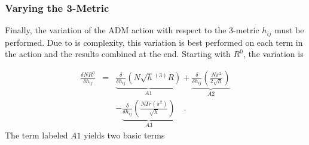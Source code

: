 \documentclass[twocolumn]{article}
\def\.{{\quad .}}
\begin{document}
\subsubsection{Varying the 3-Metric}

Finally, the variation of the ADM action with respect to the 3-metric $h_{ij}$
must be performed.  Due to is complexity, this variation is best performed
on each term in the action and the results combined at the end.  Starting with
$R^0$, the variation is

\begin{eqnarray*}
   \frac{\delta N R^0}{\delta h_{ij}} & = &
   \underbrace{\frac{\delta}{\delta h_{ij}} \left( N \sqrt{h} {}^{(3)}R \right)}
              _{A1}
  +\underbrace{\frac{\delta}{\delta h_{ij}} \left( \frac{N \pi^2}{2 \sqrt{h}} \right)}
              _{A2} \\
  & &
  -\underbrace{\frac{\delta}{\delta h_{ij}} \left( \frac{N Tr \left(\pi^2 \right)}
                                                   {\sqrt{h}} \right)}
              _{A3} \.
\end{eqnarray*}
The term labeled $A1$ yields two basic terms
\end{document}
